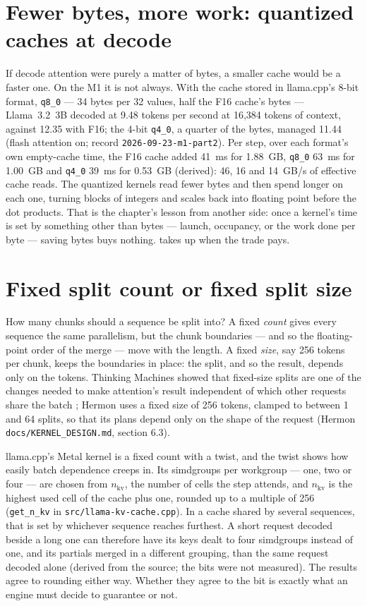 \section{Fewer bytes, more work: quantized caches at decode}

If decode attention were purely a matter of bytes, a smaller cache would be a
faster one. On the M1 it is not always. With the cache stored in llama.cpp's
8-bit format, \texttt{q8\_0} --- 34 bytes per 32 values, half the F16 cache's
bytes --- Llama~3.2~3B decoded at 9.48 tokens per second at 16,384 tokens of
context, against 12.35 with F16; the 4-bit \texttt{q4\_0}, a quarter of the
bytes, managed 11.44 (flash attention on; record \texttt{2026-09-23-m1-part2}).
Per step, over each format's own empty-cache time, the F16 cache added 41~ms
for 1.88~GB, \texttt{q8\_0} 63~ms for 1.00~GB and \texttt{q4\_0} 39~ms for
0.53~GB (derived): 46, 16 and 14~GB/s of effective cache reads. The quantized
kernels read fewer bytes and then spend longer on each one, turning blocks of
integers and scales back into floating point before the dot products. That is
the chapter's lesson from another side: once a kernel's time is set by
something other than bytes --- launch, occupancy, or the work done per byte ---
saving bytes buys nothing.  takes up when the trade pays.

\section{Fixed split count or fixed split size}

How many chunks should a sequence be split into? A fixed \emph{count} gives
every sequence the same parallelism, but the chunk boundaries --- and so the
floating-point order of the merge --- move with the length. A fixed
\emph{size}, say 256 tokens per chunk, keeps the boundaries in place: the
split, and so the result, depends only on the tokens. Thinking Machines showed
that fixed-size splits are one of the changes needed to make attention's
result independent of which other requests share the batch
\cite{he2025nondeterminism}; Hermon uses a fixed size of 256 tokens, clamped to
between 1 and 64 splits, so that its plans depend only on the shape of the
request (Hermon \texttt{docs/KERNEL\_DESIGN.md}, section 6.3).

llama.cpp's Metal kernel is a fixed count with a twist, and the twist shows how
easily batch dependence creeps in. Its simdgroups per workgroup --- one, two or
four --- are chosen from $n_\text{kv}$, the number of cells the step attends, and
$n_\text{kv}$ is the highest used cell of the cache plus one, rounded up to a
multiple of 256 (\texttt{get\_n\_kv} in \texttt{src/llama-kv-cache.cpp}). In a
cache shared by several sequences, that is set by whichever sequence reaches
furthest. A short request decoded beside a long one can therefore have its keys
dealt to four simdgroups instead of one, and its partials merged in a different
grouping, than the same request decoded alone (derived from the source; the
bits were not measured). The results agree to rounding either way. Whether they
agree to the bit is exactly what an engine must decide to guarantee or not.

